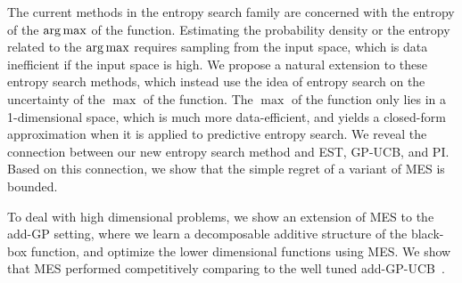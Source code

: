 The current methods in the entropy search family are concerned with  the entropy of the $\operatorname{arg\,max}$ of the function. Estimating the probability density or the entropy related to the $\operatorname{arg\,max}$ requires sampling from the input space, which is data inefficient if the input space is high. We propose a natural extension to these entropy search methods, which instead use the idea of entropy search on the uncertainty of the $\max$ of the function. The $\max$ of the function only lies in a 1-dimensional space, which is much more data-efficient, and yields a closed-form approximation when it is applied to predictive entropy search. We reveal the connection between our new entropy search method and EST, GP-UCB, and PI. Based on this connection, we show that the simple regret of a variant of MES is bounded.

To deal with high dimensional problems, we show an extension of MES to the add-GP setting, where we learn a decomposable additive structure of the black-box function, and optimize the lower dimensional functions using MES. We show that MES performed competitively comparing to the well tuned add-GP-UCB~\cite{kandasamy2015high}. 

%

\fi



